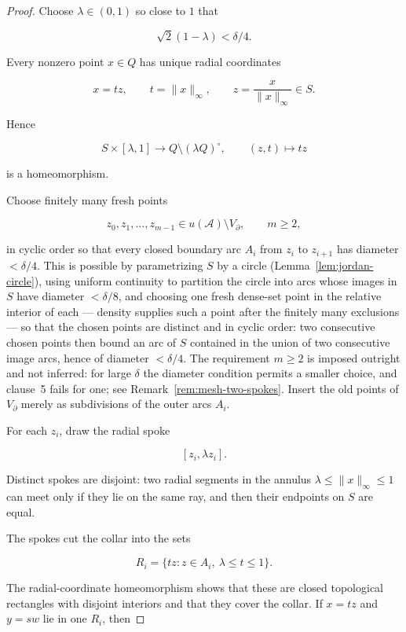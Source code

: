 \documentclass[11pt]{article}
\theoremstyle{mainplain}
\theoremstyle{mainroman}
\theoremstyle{definition}
\numberwithin{equation}{section}
\begin{document}
\begin{proof}
Choose \(\lambda\in(0,1)\) so close to \(1\) that

\[
\sqrt2(1-\lambda)<\delta/4.
\]

Every nonzero point \(x\in Q\) has unique radial coordinates

\[
x=t z,
\qquad
t=\|x\|_\infty,
\qquad
z=\frac{x}{\|x\|_\infty}\in S.
\]

Hence

\[
S\times[\lambda,1]\longrightarrow
Q\setminus(\lambda Q)^\circ,
\qquad
(z,t)\longmapsto tz
\]

is a homeomorphism.

Choose finitely many fresh points

\[
z_0,z_1,\ldots,z_{m-1}\in u(\mathcal A)\setminus V_\partial,
\qquad m\ge2,
\]

in cyclic order so that every closed boundary arc \(A_i\) from \(z_i\) to \(z_{i+1}\) has diameter \(<\delta/4\). This is possible by parametrizing \(S\) by a circle (Lemma~\ref{lem:jordan-circle}), using uniform continuity to partition the circle into arcs whose images in \(S\) have diameter \(<\delta/8\), and choosing one fresh dense-set point in the relative interior of each --- density supplies such a point after the finitely many exclusions --- so that the chosen points are distinct and in cyclic order: two consecutive chosen points then bound an arc of \(S\) contained in the union of two consecutive image arcs, hence of diameter \(<\delta/4\). The requirement \(m\ge2\) is imposed outright and not inferred: for large \(\delta\) the diameter condition permits a smaller choice, and clause~5 fails for one; see Remark~\ref{rem:mesh-two-spokes}. Insert the old points of \(V_\partial\) merely as subdivisions of the outer arcs \(A_i\).

For each \(z_i\), draw the radial spoke

\[
[z_i,\lambda z_i].
\]

Distinct spokes are disjoint: two radial segments in the annulus \(\lambda\le\|x\|_\infty\le1\) can meet only if they lie on the same ray, and then their endpoints on \(S\) are equal.

The spokes cut the collar into the sets

\[
R_i
 =
\{t z:z\in A_i,\ \lambda\le t\le1\}.
\]

The radial-coordinate homeomorphism shows that these are closed topological rectangles with disjoint interiors and that they cover the collar. If \(x=t z\) and \(y=s w\) lie in one \(R_i\), then


\end{proof}
\end{document}
